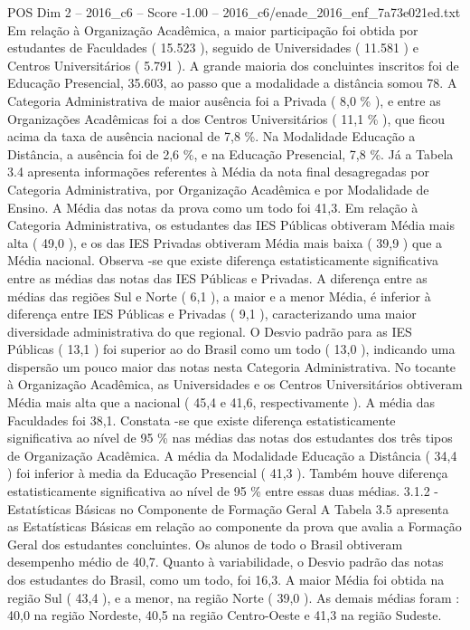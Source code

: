 \begin{textsample}{POS Dim 2 – 2016\_c6 – Score -1.00 – 2016\_c6/enade\_2016\_enf\_7a73e021ed.txt}
Em relação à Organização Acadêmica, a maior participação foi obtida por estudantes de Faculdades ( 15.523 ), seguido de Universidades ( 11.581 ) e Centros Universitários ( 5.791 ).
A grande maioria dos concluintes inscritos foi de Educação Presencial, 35.603, ao passo que a modalidade a distância somou 78.
A Categoria Administrativa de maior ausência foi a Privada ( 8,0 \% ), e entre as Organizações Acadêmicas foi a dos Centros Universitários ( 11,1 \% ), que ficou acima da taxa de ausência nacional de 7,8 \%.
Na Modalidade Educação a Distância, a ausência foi de 2,6 \%, e na Educação Presencial, 7,8 \%.
Já a Tabela 3.4 apresenta informações referentes à Média da nota final desagregadas por Categoria Administrativa, por Organização Acadêmica e por Modalidade de Ensino.
A Média das notas da prova como um todo foi 41,3.
Em relação à Categoria Administrativa, os estudantes das IES Públicas obtiveram Média mais alta ( 49,0 ), e os das IES Privadas obtiveram Média mais baixa ( 39,9 ) que a Média nacional.
Observa -se que existe diferença estatisticamente significativa entre as médias das notas das IES Públicas e Privadas.
A diferença entre as médias das regiões Sul e Norte ( 6,1 ), a maior e a menor Média, é inferior à diferença entre IES Públicas e Privadas ( 9,1 ), caracterizando uma maior diversidade administrativa do que regional.
O Desvio padrão para as IES Públicas ( 13,1 ) foi superior ao do Brasil como um todo ( 13,0 ), indicando uma dispersão um pouco maior das notas nesta Categoria Administrativa.
No tocante à Organização Acadêmica, as Universidades e os Centros Universitários obtiveram Média mais alta que a nacional ( 45,4 e 41,6, respectivamente ).
A média das Faculdades foi 38,1.
Constata -se que existe diferença estatisticamente significativa ao nível de 95 \% nas médias das notas dos estudantes dos três tipos de Organização Acadêmica.
A média da Modalidade Educação a Distância ( 34,4 ) foi inferior à media da Educação Presencial ( 41,3 ).
Também houve diferença estatisticamente significativa ao nível de 95 \% entre essas duas médias. 3.1.2 - Estatísticas Básicas no Componente de Formação Geral A Tabela 3.5 apresenta as Estatísticas Básicas em relação ao componente da prova que avalia a Formação Geral dos estudantes concluintes.
Os alunos de todo o Brasil obtiveram desempenho médio de 40,7.
Quanto à variabilidade, o Desvio padrão das notas dos estudantes do Brasil, como um todo, foi 16,3.
A maior Média foi obtida na região Sul ( 43,4 ), e a menor, na região Norte ( 39,0 ).
As demais médias foram : 40,0 na região Nordeste, 40,5 na região Centro-Oeste e 41,3 na região Sudeste.

\end{textsample}
